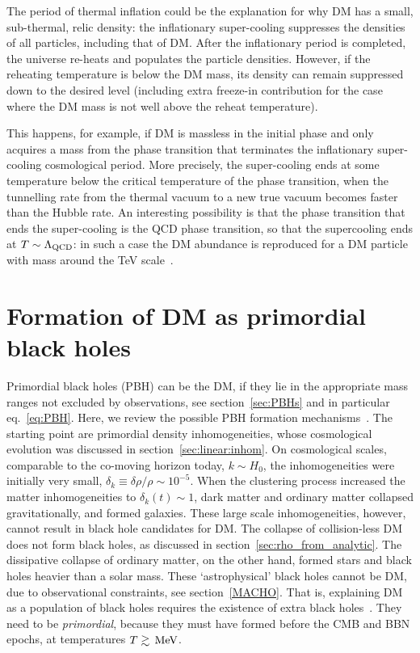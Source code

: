 The period of thermal inflation could be the explanation for why DM has a small, sub-thermal, relic density:
the inflationary super-cooling suppresses the densities of all particles, including that of DM.  
After the inflationary period  is completed, the universe re-heats and populates the particle densities. 
However, if the reheating temperature is below the DM mass, its density can remain suppressed down to the desired level 
(including extra freeze-in contribution for the case where the DM mass is not well above the reheat temperature).

This happens, for example, if DM is massless in the initial phase and only acquires a mass from the phase transition
that terminates the inflationary super-cooling cosmological period.
More precisely, the super-cooling ends at some temperature below the critical temperature of the phase transition, 
when the tunnelling rate  from the thermal vacuum to a new true vacuum becomes faster than the Hubble rate.
An interesting possibility is that the  phase transition that ends the super-cooling is the QCD phase transition, 
so that the supercooling ends at $T \sim \Lambda_{\rm QCD}$:
in such a case the DM abundance is reproduced for a DM particle with mass around the TeV scale~\cite{SupercoolDM}.




\section{Formation of DM as primordial black holes}\label{sec:PBHform}

Primordial black holes (PBH) can be the DM, if they lie in the appropriate mass ranges not excluded by observations, see section~\ref{sec:PBHs} and in particular eq.~\eqref{eq:PBH}.
Here, we review the possible PBH formation mechanisms~\cite{PBHformation}.
The starting point are primordial density inhomogeneities, whose cosmological evolution was discussed  in section~\ref{sec:linear:inhom}. 
On cosmological scales, comparable  to the co-moving horizon today, $k \sim H_0$, the inhomogeneities were initially very small, $\delta_k \equiv \delta\rho/\rho\sim 10^{-5}$.
When the clustering process increased the matter inhomogeneities to $\delta_k(t)\sim 1$,
dark matter  and ordinary matter collapsed gravitationally, and formed galaxies.
These large scale inhomogeneities, however, cannot result in black hole candidates for DM.
The collapse of collision-less DM does not form black holes, as discussed in section~\ref{sec:rho_from_analytic}.
The dissipative collapse of ordinary matter, on the other hand, formed stars and black holes heavier than a solar mass.
These `astrophysical' black  holes cannot be DM, due to observational constraints, see section~\ref{MACHO}.
That is, explaining DM as a population of black holes requires the existence of extra black holes~\cite{PBH}.
They need to be {\em primordial}, because they must have formed before the CMB and BBN epochs, at temperatures $T \gtrsim \,{\rm MeV}$.


